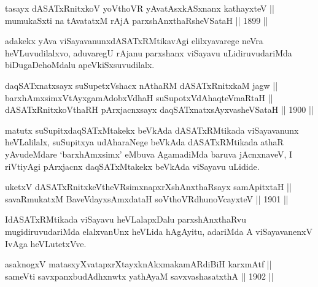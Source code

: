 
\begin{shl}
tasayx dASATxRnitxkoV yoV\s thoVR yAvatAsxkASxnanx kathayxteV || \\
mumukaSxti na tAvatatxM rAjA parxshAnxthaRsheVSataH \hfill || 1899 ||
  
\end{shl}

\begin{artha}
adakekx yAva viSayavanunxdASATxRMtikavAgi elilxyavarege neVra
heVLuvudilalxvo, aduvaregU rAjanu parxshanx viSayavu uLidiruvudariMda
biDugaDehoMdalu apeVkiSxsuvudilalx.
\end{artha}

\begin{shl}
daqSATxnatxsayx suSupetxVshacx nAthaRM dASATxRnitxkaM jagw || \\
barxhAmxsimxVtAyxgamAdobxVdhaH suSupotxVdAhaqteVmaRtaH || \\
dASATxRnitxkoV\s thaRH pArxjacnxsayx daqSATxnatxsAyxvasheVSataH \hfill || 1900 ||
  
\end{shl}

\begin{artha}
matutx suSupitxdaqSATxMtakekx beVkAda dASATxRMtikada viSayavanunx
heVLalilalx, suSupitxya udAharaNege beVkAda dASATxRMtikada athaR
yAvudeMdare `barxhAmxsimx' eMbuva AgamadiMda baruva jAcnxnaveV, I
riVtiyAgi pArxjacnx daqSATxMtakekx beVkAda viSayavu uLidide.
\end{artha}

\begin{shl}
uketxV dASATxRnitxkeV\s theVR\s simxnapxrXshAnxthaRsayx samApitxtaH || \\
savaRmukatxM BaveVdayxsAmxdataH soV\s thoVR\s dhunoVcayxteV \hfill || 1901 ||
  
\end{shl}

\begin{artha}
IdASATxRMtikada viSayavu heVLalapxDalu parxshAnxthaRvu
mugidiruvudariMda elalxvanUnx heVLida hAgAyitu, adariMda A
viSayavanenxV IvAga heVLutetxVve.
\end{artha}

\begin{shl}
asaknogxV matasxyXvatapxrXtayxknAkxmakamARdiBiH karxmAtf || \\
sameVti savxpanxbudAdhxnwtx yathA\s yaM savxvashasatxthA \hfill || 1902 ||
  
\end{shl}


